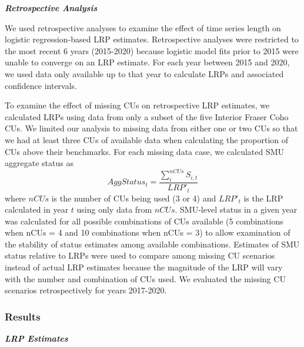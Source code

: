 \documentclass[11pt]{book}
\begin{document}
\textbf{\emph{Retrospective Analysis}}

We used retrospective analyses to examine the effect of time series length on logistic regression-based LRP estimates. Retrospective analyses were restricted to the most recent 6 years (2015-2020) because logistic model fits prior to 2015 were unable to converge on an LRP estimate. For each year between 2015 and 2020, we used data only available up to that year to calculate LRPs and associated confidence intervals.

To examine the effect of missing CUs on retrospective LRP estimates, we calculated LRPs using data from only a subset of the five Interior Fraser Coho CUs. We limited our analysis to missing data from either one or two CUs so that we had at least three CUs of available data when calculating the proportion of CUs above their benchmarks. For each missing data case, we calculated SMU aggregate status as
\begin{equation}
  AggStatus_t = \frac{\sum_{i}^{nCUs} S_{i,t}}{LRP'_t}
   \label{eq:status}
\end{equation}
where \(nCUs\) is the number of CUs being used (3 or 4) and \(LRP'_t\) is the LRP calculated in year \(t\) using only data from \(nCUs\). SMU-level status in a given year was calculated for all possible combinations of CUs available (5 combinations when nCUs = 4 and 10 combinations when nCUs = 3) to allow examination of the stability of status estimates among available combinations. Estimates of SMU status relative to LRPs were used to compare among missing CU scenarios instead of actual LRP estimates because the magnitude of the LRP will vary with the number and combination of CUs used. We evaluated the missing CU scenarios retrospectively for years 2017-2020.

\hypertarget{results-1}{%
\subsubsection{Results}\label{results-1}}

\textbf{\emph{LRP Estimates}}
\end{document}
